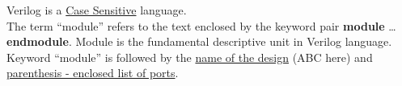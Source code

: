\documentclass[12pt, a4paper]{article}
\begin{document}
Verilog is a \underline{Case Sensitive} language. \\
The term ``module'' refers to the text enclosed by the keyword pair \textbf{module} \ldots \textbf{endmodule}. Module is the fundamental descriptive unit in Verilog language. \\
Keyword ``module'' is followed by the \underline{name of the design} (ABC here) and \uline{parenthesis - enclosed list of ports}.\\
\end{document}
